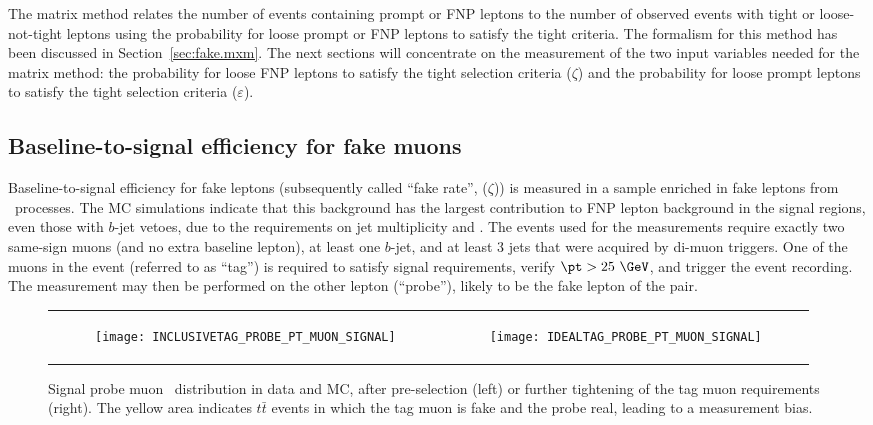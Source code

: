 The matrix method relates the number of events containing prompt or FNP leptons 
to the number of observed events with tight or loose-not-tight leptons 
using the probability for loose prompt or FNP leptons to satisfy the tight criteria.
The formalism for this method has been discussed in Section~\ref{sec:fake.mxm}.
The next sections will concentrate on the measurement of the 
two input variables needed for the matrix method:
the probability for loose FNP leptons to satisfy the tight selection
criteria ($\zeta$) and 
the probability for loose prompt leptons to satisfy the tight selection 
criteria ($\varepsilon$).

\subsection*{Baseline-to-signal efficiency for fake muons}

Baseline-to-signal efficiency for fake leptons (subsequently called ``fake rate'', ($\zeta$)) is measured 
in a sample enriched in fake leptons from \ttbar\ processes.
The MC simulations indicate that this background has the largest contribution to FNP lepton background in the signal regions, 
even those with $b$-jet vetoes, due to the requirements on jet multiplicity and \met. 
The events used for the measurements require exactly two same-sign muons (and no extra baseline lepton), 
at least one $b$-jet, and at least 3 jets that were acquired by di-muon triggers.
One of the muons in the event (referred to as ``tag'') is required to satisfy signal requirements, verify $\pt>25~\GeV$, 
and trigger the event recording. 
The measurement may then be performed on the other lepton (``probe''), likely to be the fake lepton of the pair. 

\begin{figure}[htb!]
\centering
\begin{tabular}{rr}
\begin{subfigure}[t]{0.5\textwidth}\texttt{[image: INCLUSIVETAG\_PROBE\_PT\_MUON\_SIGNAL]}\caption{}\label{fig:bkg.mxm.INCLUSIVETAG_PROBE_PT_MUON_SIGNAL}\end{subfigure}&
\begin{subfigure}[t]{0.5\textwidth}\texttt{[image: IDEALTAG\_PROBE\_PT\_MUON\_SIGNAL]}\caption{}\label{fig:bkg.mxm.IDEALTAG_PROBE_PT_MUON_SIGNAL}\end{subfigure} \\
\end{tabular}
\caption
{Signal probe muon \pt\ distribution in data and MC, after pre-selection (left) 
or further tightening of the tag muon requirements (right).
The yellow area indicates $t\bar t$ events in which the tag muon is fake and the probe real, 
leading to a measurement bias. 
}
\label{Figurefakes_preselection_muon}
\end{figure}

